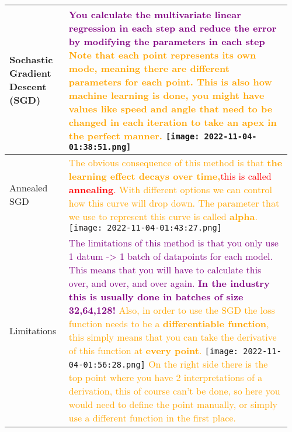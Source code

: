 \documentclass[main.tex,fontsize=8pt,paper=a4,paper=portrait,DIV=calc,]{scrartcl}
\begin{document}
\pagebreak
\begin{table}[ht!]
\begin{tabular}{|m{0.2\linewidth}|m{0.755\linewidth}|}
\hline
\textbf{Sochastic Gradient Descent (SGD)} & 
\textbf{\textcolor{purple}{You calculate the multivariate linear regression in each step and reduce the error by modifying the parameters in each step}}\newline
\textcolor{orange}{Note that each point represents its own mode, meaning there are different parameters for each point.\newline
This is also how machine learning is done, you might have values like speed and angle that need to be changed in each iteration to take an apex in the perfect manner.}\newline
\texttt{[image: 2022-11-04-01:38:51.png]}\\
\hline
Annealed SGD & 
\textcolor{orange}{The obvious consequence of this method is that \textbf{the learning effect decays over time,}}\textcolor{red}{this is called \textbf{annealing}.}\newline
\textcolor{orange}{With different options we can control how this curve will drop down. The parameter that we use to represent this curve is called \textbf{alpha}.}\newline
\texttt{[image: 2022-11-04-01:43:27.png]}\\
\hline
Limitations & 
\textcolor{purple}{The limitations of this method is that you only use 1 datum -> 1 batch of datapoints for each model. This means that you will have to calculate this over, and over, and over again.\newline
\textbf{In the industry this is usually done in batches of size 32,64,128!}}\newline
\textcolor{orange}{Also, in order to use the SGD the loss function needs to be a \textbf{differentiable function}, this simply means that you can take the derivative of this function at \textbf{every point}. }\newline
\texttt{[image: 2022-11-04-01:56:28.png]}\newline
\textcolor{orange}{On the right side there is the top point where you have 2 interpretations of a derivation, this of course can't be done, so here you would need to define the point manually, or simply use a different function in the first place.}\\
\hline
\end{tabular}
\end{table}
\end{document}
